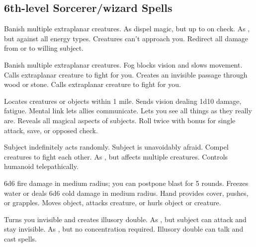 \subsection{6th-level Sorcerer/wizard Spells} 
\begin{swspelllist}
   Banish multiple extraplanar creatures. 
   As dispel magic, but up to  on check.
   As , but against all energy types.
   Creatures can't approach you.
   Redirect all damage from or to willing subject.

   Banish multiple extraplanar creatures. 
   Fog blocks vision and slows movement.
   Calls extraplanar creature to fight for you.
   Creates an invisible passage through wood or stone.
   Calls extraplanar creature to fight for you.

   Locates creatures or objects within 1 mile.
   Sends vision dealing 1d10 damage, fatigue.
   Mental link lets allies communicate.
  \M Lets you see all things as they really are.
  \F  Reveals all magical aspects of subjects.
   Roll twice with bonus for single attack, save, or opposed check.

   Subject indefinitely acts randomly.
   Subject is unavoidably afraid.
   Compel creatures to fight each other.
   As , but affects multiple creatures.
   Controls humanoid telepathically.

   6d6 fire damage in medium radius; you can postpone blast for 5 rounds.
   Freezes water or deals 6d6 cold damage in medium radius.
   Hand provides cover, pushes, or grapples.
   Moves object, attacks creature, or hurls object or creature.

   Turns you invisible and creates illusory double.
   As , but subject can attack and stay invisible.
   As , but no concentration required.
   Illusory double can talk and cast spells.


\end{swspelllist}
